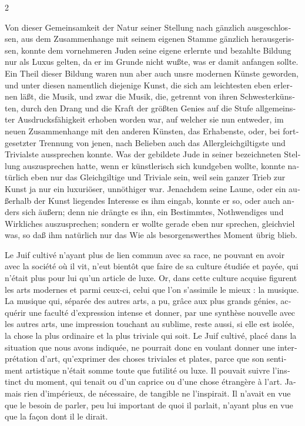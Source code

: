 \documentclass[a4paper,12pt]{article}
\newcommand\chunks[2]{%
\begin{leftcolumn*}\begin{otherlanguage}{german}%
{#1}%
\end{otherlanguage}\end{leftcolumn*}%
\begin{rightcolumn}\begin{otherlanguage}{french}%
{#2}%
\end{otherlanguage}\end{rightcolumn}%
}
\begin{document}
\begin{paracol}{2}
  \chunks{Von dieser Gemeinsamkeit der Natur seiner Stellung nach gänzlich ausgeschlossen, aus dem Zusammenhange mit seinem eigenen Stamme gänzlich herausgerissen, konnte dem vornehmeren Juden seine eigene erlernte und bezahlte Bildung nur als Luxus gelten, da er im Grunde nicht wußte, was er damit anfangen sollte. Ein Theil dieser Bildung waren nun aber auch unsre modernen Künste geworden, und unter diesen namentlich diejenige Kunst, die sich am leichtesten eben erlernen läßt, die Musik, und zwar die Musik, die, getrennt von ihren Schwesterkünsten, durch den Drang und die Kraft der größten Genies auf die Stufe allgemeinster Ausdrucksfähigkeit erhoben worden war, auf welcher sie nun entweder, im neuen Zusammenhange mit den anderen Künsten, das Erhabenste, oder, bei fortgesetzter Trennung von jenen, nach Belieben auch das Allergleichgiltigste und Trivialste aussprechen konnte. Was der gebildete Jude in seiner bezeichneten Stellung auszusprechen hatte, wenn er künstlerisch sich kundgeben wollte, konnte natürlich eben nur das Gleichgiltige und Triviale sein, weil sein ganzer Trieb zur Kunst ja nur ein luxuriöser, unnöthiger war. Jenachdem seine Laune, oder ein außerhalb der Kunst liegendes Interesse es ihm eingab, konnte er so, oder auch anders sich äußern; denn nie drängte es ihn, ein Bestimmtes, Nothwendiges und Wirkliches auszusprechen; sondern er wollte gerade eben nur sprechen, gleichviel was, so daß ihm natürlich nur das Wie als besorgenswerthes Moment übrig blieb.}
         {Le Juif cultivé n’ayant plus de lien commun avec sa race, ne pouvant en avoir avec la société où il vit, n’eut bientôt que faire de sa culture étudiée et payée, qui n’était plus pour lui qu’un article de luxe. Or, dans cette culture acquise figurent les arts modernes et parmi ceux-ci, celui que l’on s’assimile le mieux : la musique. La musique qui, séparée des autres arts, a pu, grâce aux plus grands génies, acquérir une faculté d’expression intense et donner, par une synthèse nouvelle avec les autres arts, une impression touchant au sublime, reste aussi, si elle est isolée, la chose la plus ordinaire et la plus triviale qui soit. Le Juif cultivé, placé dans la situation que nous avons indiquée, ne pourrait donc en voulant donner une interprétation d’art, qu’exprimer des choses triviales et plates, parce que son sentiment artistique n’était somme toute que futilité ou luxe. Il pouvait suivre l’instinct du moment, qui tenait ou d’un caprice ou d’une chose étrangère à l’art. Jamais rien d’impérieux, de nécessaire, de tangible ne l’inspirait. Il n’avait en vue que le besoin de parler, peu lui important de quoi il parlait, n’ayant plus en vue que la façon dont il le dirait.}

\end{paracol}
\end{document}
